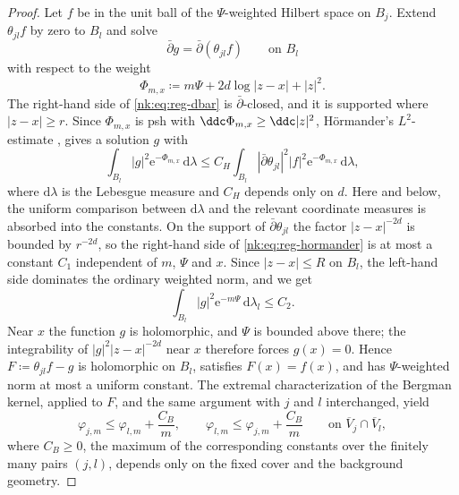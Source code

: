 \begin{proof}
Let $f$ be in the unit ball of the $\Psi$-weighted Hilbert space on
$B_j$. Extend $\theta_{jl}f$ by zero to $B_l$ and solve
\begin{equation}\label{nk:eq:reg-dbar}
  \bar\partial g=\bar\partial(\theta_{jl}f)\qquad\text{on }B_l
\end{equation}
with respect to the weight
\[
  \Phi_{m,x}\coloneqq m\Psi+2d\log|z-x|+|z|^2 .
\]
The right-hand side of
\eqref{nk:eq:reg-dbar} is $\bar\partial$-closed, and it is supported where
$|z-x|\ge r$. Since $\Phi_{m,x}$ is psh with
$\ddc\Phi_{m,x}\ge\ddc|z|^2$, H\"ormander's $L^2$-estimate \cite[Chapter~VIII, \S6]{DemCADG}, gives a solution $g$ with
\begin{equation}\label{nk:eq:reg-hormander}
  \int_{B_l}|g|^2\mathrm{e}^{-\Phi_{m,x}}\,\mathrm{d}\lambda
  \le C_H\int_{B_l}|\bar\partial\theta_{jl}|^2|f|^2\mathrm{e}^{-\Phi_{m,x}}\,\mathrm{d}\lambda,
\end{equation}
where $\mathrm{d}\lambda$ is the Lebesgue measure and $C_H$ depends only on
$d$. Here and below, the uniform comparison between $\mathrm{d}\lambda$
and the relevant coordinate measures is absorbed into the constants. On the support of
$\bar\partial\theta_{jl}$ the factor $|z-x|^{-2d}$ is bounded by
$r^{-2d}$, so the right-hand side of \eqref{nk:eq:reg-hormander} is at most
a constant $C_1$ independent of $m$, $\Psi$ and $x$. Since
$|z-x|\le R$ on $B_l$, the left-hand side dominates the ordinary
weighted norm, and we get
\[
  \int_{B_l}|g|^2\mathrm{e}^{-m\Psi}\,\mathrm{d}\lambda_l\le C_2 .
\]
Near $x$ the function $g$ is holomorphic, and $\Psi$ is bounded
above there; the integrability of $|g|^2|z-x|^{-2d}$ near $x$ therefore
forces $g(x)=0$. Hence
$F\coloneqq \theta_{jl}f-g$ is holomorphic on $B_l$, satisfies $F(x)=f(x)$, and
has $\Psi$-weighted norm at most a uniform constant. The extremal
characterization of the Bergman kernel, applied to $F$, and the same
argument with $j$ and $l$ interchanged, yield
\begin{equation}\label{nk:eq:reg-overlap}
  \varphi_{j,m}\le\varphi_{l,m}+\frac{C_B}{m},\qquad
  \varphi_{l,m}\le\varphi_{j,m}+\frac{C_B}{m}
  \qquad\text{on }\overline V_j\cap\overline V_l,
\end{equation}
where $C_B\ge0$, the maximum of the corresponding constants over the
finitely many pairs $(j,l)$, depends only on the fixed cover
and the background geometry.
 

\end{proof}
